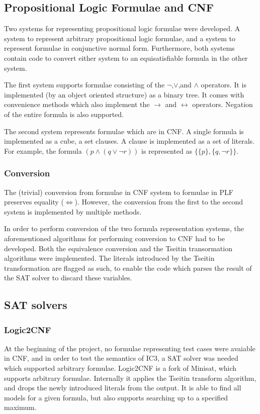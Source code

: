 \documentclass[a4paper]{article}
\begin{document}
\subsection{Propositional Logic Formulae and CNF}
Two systems for representing propositional logic formulae were developed. A system to represent arbitrary propositional logic formulae, and a system to represent formulae in conjunctive normal form. Furthermore, both systems contain code to convert either system to an equisatisfiable formula in the other system.

The first system supports formulae consisting of the $\lnot$,$\lor$,and $\land$ operators. It is implemented (by an object oriented structure) as a binary tree. It comes with convenience methods which also implement the $\rightarrow$ and $\leftrightarrow$ operators. Negation of the entire formula is also supported.

The second system represents formulae which are in CNF. A single formula is implemented as a cube, a set clauses. A clause is implemented as a set of literals. For example, the formula $(p \land (q \lor \lnot r))$ is represented as $\{\{p\},\{q,\lnot r\}\}$.

\subsubsection{Conversion}
The (trivial) conversion from formulae in CNF system to formulae in PLF preserves equality ($\Leftrightarrow$). However, the conversion from the first to the second system is implemented by multiple methods.

In order to perform conversion of the two formula representation systems, the aforementioned algorithms for performing conversion to CNF had to be developed. Both the equivalence conversion and the Tseitin transormation algorithms were implemented.  The literals introduced by the Tseitin transformation are flagged as such, to enable the code which parses the result of the SAT solver to discard these variables.

\subsection{SAT solvers}
\subsubsection{Logic2CNF}
At the beginning of the project, no formulae representing test cases were avaiable in CNF, and in order to test the semantics of IC3, a SAT solver was needed which supported arbitrary formulae. Logic2CNF is a fork of Minisat, which supports arbitrary formulae. Internally it applies the Tseitin transform algorithm, and drops the newly introduced literals from the output. It is able to find all models for a given formula, but also supports searching up to a specified maximum.
\end{document}
